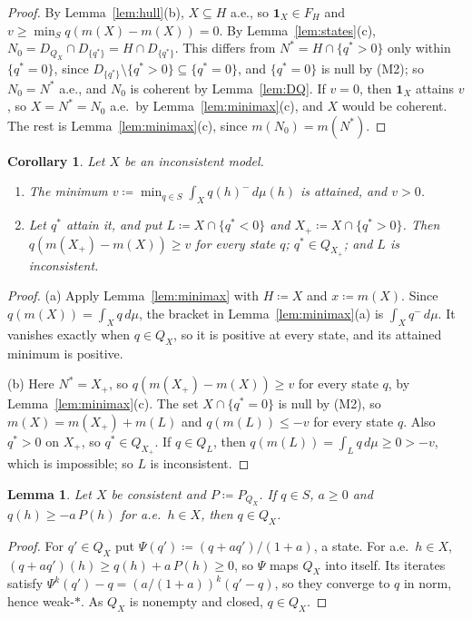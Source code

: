 \documentclass[11pt]{article}
\newcommand{\one}{\mathbf{1}}
\theoremstyle{plain}
\newtheorem{lemma}[theorem]{Lemma}
\newtheorem{corollary}[theorem]{Corollary}
\theoremstyle{definition}
\begin{document}
\begin{proof}
By Lemma~\ref{lem:hull}(b), $X\subseteq H$ a.e., so $\one_X\in F_H$ and $v\ge\min_Sq(m(X)-
m(X))=0$. By Lemma~\ref{lem:states}(c), $N_0=D_{Q_X}\cap D_{\{q^\ast\}}=H\cap D_{\{q^\ast\}}$.
This differs from $N^\ast=H\cap\{q^\ast>0\}$ only within $\{q^\ast=0\}$, since $D_{\{q^\ast\}}
\setminus\{q^\ast>0\}\subseteq\{q^\ast=0\}$, and $\{q^\ast=0\}$ is null by (M2); so $N_0=N^\ast$
a.e., and $N_0$ is coherent by Lemma~\ref{lem:DQ}. If $v=0$, then $\one_X$ attains $v$, so
$X=N^\ast=N_0$ a.e.\ by Lemma~\ref{lem:minimax}(c), and $X$ would be coherent. The rest is
Lemma~\ref{lem:minimax}(c), since $m(N_0)=m(N^\ast)$.
\end{proof}

\begin{corollary}\label{cor:losing}
Let $X$ be an inconsistent model.
\begin{enumerate}[label=(\alph*)]
  \item The minimum $v\coloneqq\min_{q\in S}\int_Xq(h)^-\,d\mu(h)$ is attained, and $v>0$.
  \item Let $q^\ast$ attain it, and put $L\coloneqq X\cap\{q^\ast<0\}$ and $X_+\coloneqq
  X\cap\{q^\ast>0\}$. Then $q(m(X_+)-m(X))\ge v$ for every state $q$; $q^\ast\in Q_{X_+}$; and
  $L$ is inconsistent.
\end{enumerate}
\end{corollary}

\begin{proof}
(a) Apply Lemma~\ref{lem:minimax} with $H\coloneqq X$ and $x\coloneqq m(X)$. Since $q(m(X))=
\int_Xq\,d\mu$, the bracket in Lemma~\ref{lem:minimax}(a) is $\int_Xq^-\,d\mu$. It vanishes
exactly when $q\in Q_X$, so it is positive at every state, and its attained minimum is
positive.

(b) Here $N^\ast=X_+$, so $q(m(X_+)-m(X))\ge v$ for every state $q$, by
Lemma~\ref{lem:minimax}(c). The set $X\cap\{q^\ast=0\}$ is null by (M2), so $m(X)=m(X_+)+m(L)$
and $q(m(L))\le-v$ for every state $q$. Also $q^\ast>0$ on $X_+$, so $q^\ast\in Q_{X_+}$. If
$q\in Q_L$, then $q(m(L))=\int_Lq\,d\mu\ge0>-v$, which is impossible; so $L$ is inconsistent.
\end{proof}

\begin{lemma}\label{lem:contraction}
Let $X$ be consistent and $P\coloneqq P_{Q_X}$. If $q\in S$, $a\ge0$ and $q(h)\ge-a\,P(h)$
for a.e.\ $h\in X$, then $q\in Q_X$.
\end{lemma}

\begin{proof}
For $q'\in Q_X$ put $\Psi(q')\coloneqq(q+aq')/(1+a)$, a state. For a.e.\ $h\in X$, $(q+aq')(h)
\ge q(h)+a\,P(h)\ge0$, so $\Psi$ maps $Q_X$ into itself. Its iterates satisfy $\Psi^k(q')-q=
(a/(1+a))^k(q'-q)$, so they converge to $q$ in norm, hence weak-$\ast$. As $Q_X$ is nonempty
and closed, $q\in Q_X$.
\end{proof}
\end{document}
